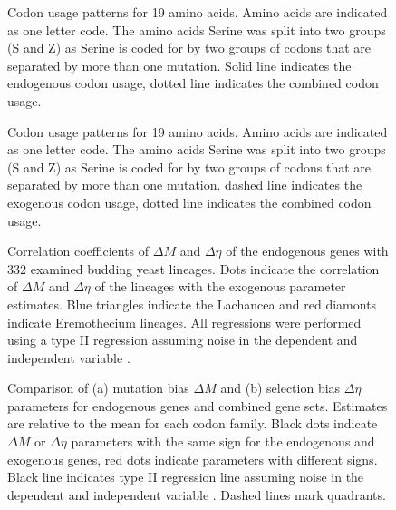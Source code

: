 \documentclass{bmcart}
\def\texttt{[image: ]}
\newcommand{\DM}{\ensuremath{{\Delta M}}\xspace}
\newcommand{\DE}{\ensuremath{{\Delta \eta}}\xspace}
\begin{document}
\begin{backmatter}
\begin{figure}
     \centering
	\caption{Codon usage patterns for 19 amino acids. Amino acids are indicated as one letter code. 
	The amino acids Serine was split into two groups (S and Z) as Serine is coded for by two groups of codons that are separated by more than one mutation.
	Solid line indicates the endogenous codon usage, dotted line indicates the combined codon usage.}
	\label{fig:cub_full_main}
\end{figure}
\null
\vfill
\begin{figure}
     \centering
	\caption{Codon usage patterns for 19 amino acids. Amino acids are indicated as one letter code. 
	The amino acids Serine was split into two groups (S and Z) as Serine is coded for by two groups of codons that are separated by more than one mutation.
	dashed line indicates the exogenous codon usage, dotted line indicates the combined codon usage.}
	\label{fig:cub_full_cleft}
\end{figure}

\null
\vfill
\begin{figure}
     \centering
	\caption{Correlation coefficients of \DM and \DE of the endogenous genes with 332 examined budding yeast lineages. 
	Dots indicate the correlation of \DM and \DE of the lineages with the exogenous parameter estimates.
	Blue triangles indicate the Lachancea and red diamonts indicate Eremothecium lineages.
	All regressions were performed using a type II regression assuming noise in the dependent and independent variable \citep{SokalAndRohlf1981}.}
	\label{fig:csp_endo_comp}
\end{figure}
\null
\vfill
\clearpage


\begin{figure}
    \centering
    \begin{subfigure}
        \centering
    \end{subfigure}
    \begin{subfigure}
        \centering
    \end{subfigure}
    \caption{Comparison of (a) mutation bias \DM and (b) selection bias \DE parameters for endogenous genes and combined gene sets.
      Estimates are relative to the mean for each codon family.
      Black dots indicate \DM or \DE parameters with the same sign for the endogenous and exogenous genes, red dots indicate parameters with different signs.
      Black line indicates type II regression line assuming noise in the dependent and independent variable \citep{SokalAndRohlf1981}.
      Dashed lines mark quadrants.}
    \label{fig:csp_end_comb}
\end{figure}
\null
\vfill
\clearpage


\end{backmatter}
\end{document}
